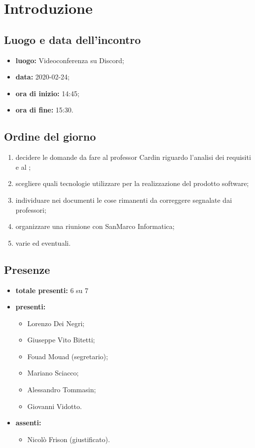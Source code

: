 \section*{Introduzione}

\subsection*{Luogo e data dell'incontro}
	\begin{itemize}
		\item \textbf{luogo:} Videoconferenza su Discord;
		\item \textbf{data:} 2020-02-24;
		\item \textbf{ora di inizio:} 14:45;
		\item \textbf{ora di fine:} 15:30.
	\end{itemize}

\subsection*{Ordine del giorno}
	\begin{enumerate}
			\item decidere le domande da fare al professor Cardin riguardo l'analisi dei requisiti e al ;
  			\item scegliere quali tecnologie utilizzare per la realizzazione del prodotto software;
  			\item individuare nei documenti le cose rimanenti da correggere segnalate dai professori;
  			\item organizzare una riunione con SanMarco Informatica;
  			\item varie ed eventuali.
	\end{enumerate}

\subsection*{Presenze}
	\begin{itemize}
		\item \textbf{totale presenti:} 6 su 7
		\item \textbf{presenti: }
			\begin{itemize}			
				\item Lorenzo Dei Negri;
				\item Giuseppe Vito Bitetti;
				\item Fouad Mouad (segretario);
				\item Mariano Sciacco;
				\item Alessandro Tommasin;
				\item Giovanni Vidotto.
			\end{itemize}
		\item \textbf{assenti: } 
			\begin{itemize}	
				\item Nicolò Frison (giustificato).
			\end{itemize}
	\end{itemize}


